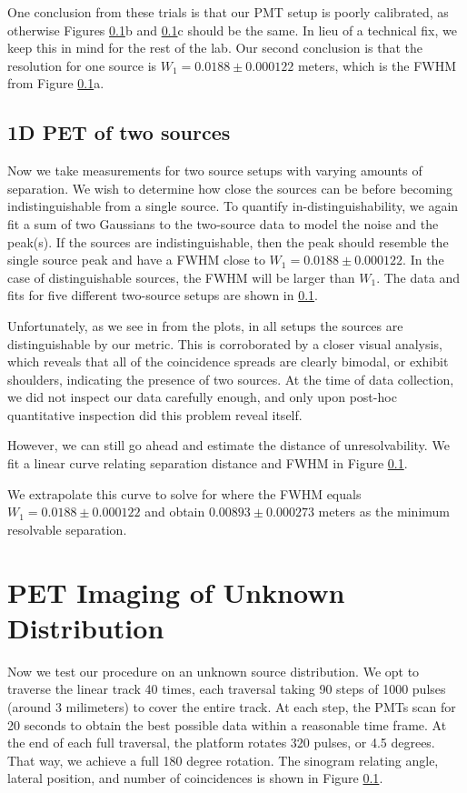 \documentclass[12pt, letterpaper]{article}
\begin{document}
One conclusion from these trials is that our PMT setup is poorly calibrated, as otherwise Figures \ref{}b and \ref{}c should be the same. In lieu of a technical fix, we keep this in mind for the rest of the lab. Our second conclusion is that the resolution for one source is $W_1 = 0.0188 \pm 0.000122$ meters, which is the FWHM from Figure \ref{}a. 

\subsection{1D PET of two sources}

Now we take measurements for two source setups with varying amounts of separation. We wish to determine how close the sources can be before becoming indistinguishable from a single source. To quantify in-distinguishability, we again fit a sum of two Gaussians to the two-source data to model the noise and the peak(s). If the sources are indistinguishable, then the peak should resemble the single source peak and have a FWHM close to $W_1 = 0.0188 \pm 0.000122$. In the case of distinguishable sources, the FWHM will be larger than $W_1$. The data and fits for five different two-source setups are shown in \ref{}. 

Unfortunately, as we see in from the plots, in all setups the sources are distinguishable by our metric. This is corroborated by a closer visual analysis, which reveals that all of the coincidence spreads are clearly bimodal, or exhibit shoulders, indicating the presence of two sources. At the time of data collection, we did not inspect our data carefully enough, and only upon post-hoc quantitative inspection did this problem reveal itself. 

However, we can still go ahead and estimate the distance of unresolvability. We fit a linear curve relating separation distance and FWHM in Figure \ref{}. 

We extrapolate this curve to solve for where the FWHM equals $W_1 = 0.0188 \pm 0.000122$ and obtain $0.00893 \pm 0.000273$ meters as the minimum resolvable separation. 

\section{PET Imaging of Unknown Distribution}\label{sec:unknown}

Now we test our procedure on an unknown source distribution. We opt to traverse the linear track 40 times, each traversal taking 90 steps of 1000 pulses (around 3 milimeters) to cover the entire track. At each step, the PMTs scan for 20 seconds to obtain the best possible data within a reasonable time frame. At the end of each full traversal, the platform rotates 320 pulses, or 4.5 degrees. That way, we achieve a full 180 degree rotation. The sinogram relating angle, lateral position, and number of coincidences is shown in Figure \ref{}. 
\end{document}
